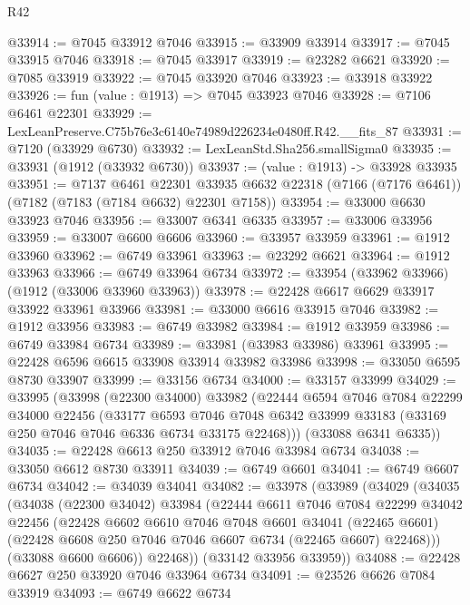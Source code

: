 \begin{lexlean}{R42}
\begin{coremodule}
{@33914 := @7045 @33912 @7046
@33915 := @33909 @33914
@33917 := @7045 @33915 @7046
@33918 := @7045 @33917
@33919 := @23282 @6621
@33920 := @7085 @33919
@33922 := @7045 @33920 @7046
@33923 := @33918 @33922
@33926 := fun (value : @1913) => @7045 @33923 @7046
@33928 := @7106 @6461 @22301
@33929 := LexLeanPreserve.C75b76e3c6140e74989d226234e0480ff.R42.__fits_87
@33931 := @7120 (@33929 @6730)
@33932 := LexLeanStd.Sha256.smallSigma0
@33935 := @33931 (@1912 (@33932 @6730))
@33937 := (value : @1913) -> @33928 @33935
@33951 := @7137
    @6461
    @22301
    @33935
    @6632
    @22318
    (@7166 (@7176 @6461))
    (@7182 (@7183 (@7184 @6632) @22301 @7158))
@33954 := @33000 @6630 @33923 @7046
@33956 := @33007 @6341 @6335
@33957 := @33006 @33956
@33959 := @33007 @6600 @6606
@33960 := @33957 @33959
@33961 := @1912 @33960
@33962 := @6749 @33961
@33963 := @23292 @6621
@33964 := @1912 @33963
@33966 := @6749 @33964 @6734
@33972 := @33954 (@33962 @33966) (@1912 (@33006 @33960 @33963))
@33978 := @22428 @6617 @6629 @33917 @33922 @33961 @33966
@33981 := @33000 @6616 @33915 @7046
@33982 := @1912 @33956
@33983 := @6749 @33982
@33984 := @1912 @33959
@33986 := @6749 @33984 @6734
@33989 := @33981 (@33983 @33986) @33961
@33995 := @22428 @6596 @6615 @33908 @33914 @33982 @33986
@33998 := @33050 @6595 @8730 @33907
@33999 := @33156 @6734
@34000 := @33157 @33999
@34029 := @33995
    (@33998
      (@22300 @34000)
      @33982
      (@22444
        @6594
        @7046
        @7084
        @22299
        @34000
        @22456
        (@33177
          @6593
          @7046
          @7048
          @6342
          @33999
          @33183
          (@33169 @250 @7046 @7046 @6336 @6734 @33175 @22468)))
      (@33088 @6341 @6335))
@34035 := @22428 @6613 @250 @33912 @7046 @33984 @6734
@34038 := @33050 @6612 @8730 @33911
@34039 := @6749 @6601
@34041 := @6749 @6607 @6734
@34042 := @34039 @34041
@34082 := @33978
    (@33989
      (@34029
        (@34035
          (@34038
            (@22300 @34042)
            @33984
            (@22444
              @6611
              @7046
              @7084
              @22299
              @34042
              @22456
              (@22428
                @6602
                @6610
                @7046
                @7048
                @6601
                @34041
                (@22465 @6601)
                (@22428 @6608 @250 @7046 @7046 @6607 @6734 (@22465 @6607) @22468)))
            (@33088 @6600 @6606))
          @22468))
      (@33142 @33956 @33959))
@34088 := @22428 @6627 @250 @33920 @7046 @33964 @6734
@34091 := @23526 @6626 @7084 @33919
@34093 := @6749 @6622 @6734
}
\end{coremodule}
\end{lexlean}
